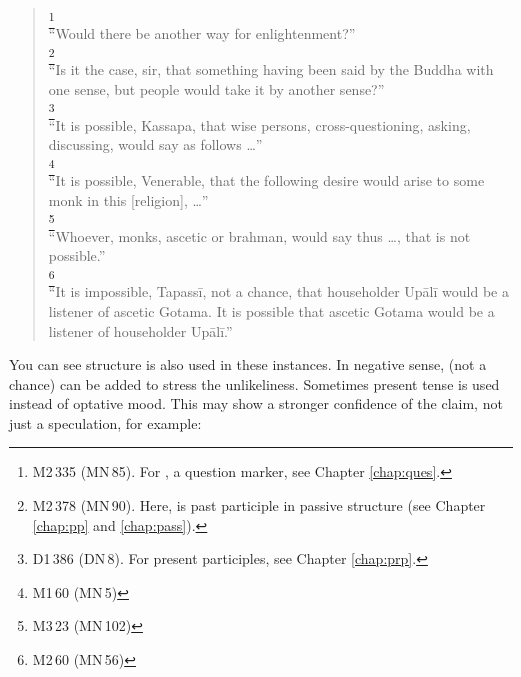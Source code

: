 \begin{quote}
\footnote{M2\,335 (MN\,85). For , a question marker, see Chapter \ref{chap:ques}.}\\
``Would there be another way for enlightenment?''\\[1.5mm]
\footnote{M2\,378 (MN\,90). Here,  is past participle in passive structure (see Chapter \ref{chap:pp} and \ref{chap:pass}).}\\
``Is it the case, sir, that something having been said by the Buddha with one sense, but people would take it by another sense?''\\[1.5mm]
\footnote{D1\,386 (DN\,8). For present participles, see Chapter \ref{chap:prp}.}\\
``It is possible, Kassapa, that wise persons, cross-questioning, asking, discussing, would say as follows \ldots''\\[1.5mm]
\footnote{M1\,60 (MN\,5)}\\
``It is possible, Venerable, that the following desire would arise to some monk in this [religion], \ldots''\\[1.5mm]
\footnote{M3\,23 (MN\,102)}\\
``Whoever, monks, ascetic or brahman, would say thus \ldots, that is not possible.''\\[1.5mm]
\footnote{M2\,60 (MN\,56)}\\
``It is impossible, Tapass\=i, not a chance, that householder Up\=al\=i would be a listener of ascetic Gotama. It is possible that ascetic Gotama would be a listener of householder Up\=al\=i.''\\[1.5mm]
\end{quote}

You can see  structure is also used in these instances. In negative sense,  (not a chance) can be added to stress the unlikeliness. Sometimes present tense is used instead of optative mood. This may show a stronger confidence of the claim, not just a speculation, for example:

